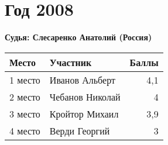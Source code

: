 \chapter{Год 2008}
\textbf{Судья: Слесаренко Анатолий (Россия)}

\begin{tabularx}{\textwidth}{l l r}
Место & Участник & Баллы \\
\hline
1 место & Иванов Альберт & 4,1 \\
2 место & Чебанов Николай & 4 \\
3 место & Кройтор Михаил & 3,9 \\
4 место & Верди Георгий & 3 \\
\end{tabularx}